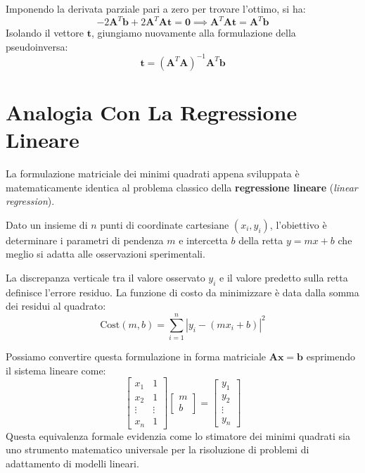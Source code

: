 ﻿\documentclass[11pt, a4paper]{article}
\begin{document}
Imponendo la derivata parziale pari a zero per trovare l'ottimo, si ha:
\[
-2\bm{A}^T\bm{b} + 2\bm{A}^T\bm{A}\bm{t} = \bm{0} \implies \bm{A}^T\bm{A}\bm{t} = \bm{A}^T\bm{b}
\]
Isolando il vettore $\bm{t}$, giungiamo nuovamente alla formulazione della pseudoinversa:
\[
\bm{t} = (\bm{A}^T\bm{A})^{-1}\bm{A}^T\bm{b}
\]

\newpage

\section{Analogia Con La Regressione Lineare}

La formulazione matriciale dei minimi quadrati appena sviluppata è matematicamente identica al problema classico della \textbf{regressione lineare} (\emph{linear regression}).


Dato un insieme di $n$ punti di coordinate cartesiane $(x_i, y_i)$, l'obiettivo è determinare i parametri di pendenza $m$ e intercetta $b$ della retta $y = mx + b$ che meglio si adatta alle osservazioni sperimentali.


La discrepanza verticale tra il valore osservato $y_i$ e il valore predetto sulla retta definisce l'errore residuo. La funzione di costo da minimizzare è data dalla somma dei residui al quadrato:
\[
\text{Cost}(m, b) = \sum_{i=1}^{n} |y_i - (mx_i + b)|^2
\]

Possiamo convertire questa formulazione in forma matriciale $\bm{A}\bm{x} = \bm{b}$ esprimendo il sistema lineare come:
\[
\begin{bmatrix}
x_1 & 1 \\
x_2 & 1 \\
\vdots & \vdots \\
x_n & 1
\end{bmatrix}
\begin{bmatrix}
m \\
b
\end{bmatrix}
=
\begin{bmatrix}
y_1 \\
y_2 \\
\vdots \\
y_n
\end{bmatrix}
\]
Questa equivalenza formale evidenzia come lo stimatore dei minimi quadrati sia uno strumento matematico universale per la risoluzione di problemi di adattamento di modelli lineari.
\end{document}
